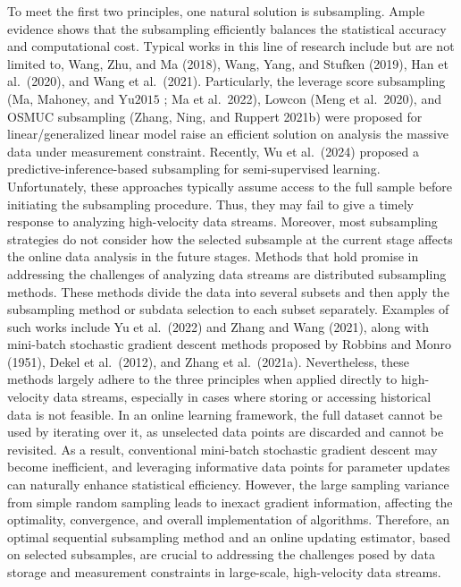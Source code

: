 \documentclass[
  10
]{article}
\begin{document}
To meet the first two principles, one natural solution is subsampling.
Ample evidence shows that the subsampling efficiently balances the
statistical accuracy and computational cost. Typical works in this line
of research include but are not limited to, Wang, Zhu, and Ma (2018),
Wang, Yang, and Stufken (2019), Han et al.~(2020), and Wang et
al.~(2021). Particularly, the leverage score subsampling (Ma, Mahoney,
and \(\mathrm { Y u } 2 0 1 5\) ; Ma et al.~2022), Lowcon (Meng et
al.~2020), and OSMUC subsampling (Zhang, Ning, and Ruppert 2021b) were
proposed for linear/generalized linear model raise an efficient solution
on analysis the massive data under measurement constraint. Recently, Wu
et al.~(2024) proposed a predictive-inference-based subsampling for
semi-supervised learning. Unfortunately, these approaches typically
assume access to the full sample before initiating the subsampling
procedure. Thus, they may fail to give a timely response to analyzing
high-velocity data streams. Moreover, most subsampling strategies do not
consider how the selected subsample at the current stage affects the
online data analysis in the future stages. Methods that hold promise in
addressing the challenges of analyzing data streams are distributed
subsampling methods. These methods divide the data into several subsets
and then apply the subsampling method or subdata selection to each
subset separately. Examples of such works include Yu et al.~(2022) and
Zhang and Wang (2021), along with mini-batch stochastic gradient descent
methods proposed by Robbins and Monro (1951), Dekel et al.~(2012), and
Zhang et al.~(2021a). Nevertheless, these methods largely adhere to the
three principles when applied directly to high-velocity data streams,
especially in cases where storing or accessing historical data is not
feasible. In an online learning framework, the full dataset cannot be
used by iterating over it, as unselected data points are discarded and
cannot be revisited. As a result, conventional mini-batch stochastic
gradient descent may become inefficient, and leveraging informative data
points for parameter updates can naturally enhance statistical
efficiency. However, the large sampling variance from simple random
sampling leads to inexact gradient information, affecting the
optimality, convergence, and overall implementation of algorithms.
Therefore, an optimal sequential subsampling method and an online
updating estimator, based on selected subsamples, are crucial to
addressing the challenges posed by data storage and measurement
constraints in large-scale, high-velocity data streams.
\end{document}

